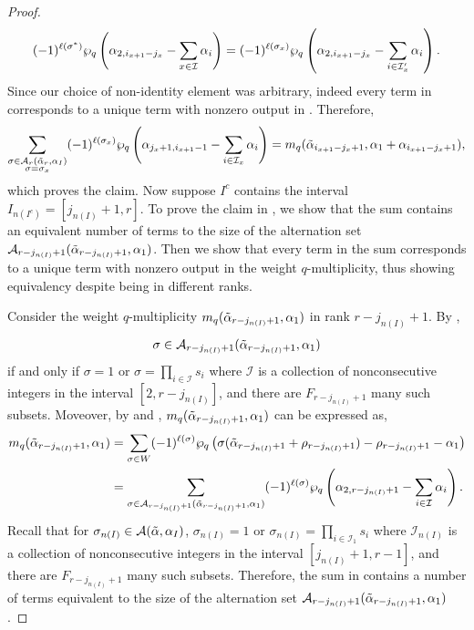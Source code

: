 \documentclass[10pt]{article}
\newcommand{\hr}[0]{\Tilde{\alpha}}
\newcommand{\newmu}[0]{\alpha_I}
\newcommand{\thealtset}[0]{\mathcal{A}(\hr,\newmu)}
\newcommand{\qpartition}[1]{\wp_q\left(#1\right)}
\begin{document}
\begin{proof}
    \begin{equation}
        (-1)^{\ell(\sigma^*)}\qpartition{\alpha_{2,i_{x+1}-j_x}-\sum_{x\in\mathcal{I}}\alpha_i} = (-1)^{\ell(\sigma_x)}\qpartition{\alpha_{2,i_{x+1}-j_x}-\sum_{i\in\mathcal{I}'_x}\alpha_i}.\notag
    \end{equation}
    Since our choice of non-identity element was arbitrary, indeed every term in  corresponds to a unique term with nonzero output in . Therefore, 
        \begin{equation}
        \sum_{\substack{\sigma\in\mathcal{A}_r(\hr_r,\alpha_I)\\\sigma=\sigma_x}}(-1)^{\ell(\sigma_x)}\qpartition{\alpha_{j_x+1,i_{x+1}-1}-\sum_{i\in\mathcal{I}_x}\alpha_i}=m_q(\hr_{i_{x+1}-j_x+1},\alpha_1+\alpha_{i_{x+1}-j_x+1}),\notag
    \end{equation}
    which proves the claim.
    Now suppose $I^c$ contains the interval $I_{n(I^c)}=[j_{n(I)}+1,r]$. To prove the claim in , we show that the sum contains an equivalent number of terms to the size of the alternation set $\mathcal{A}_{r-j_{n(I)}+1}(\hr_{r-j_{n(I)}+1},\alpha_1)$. Then we show that every term in the sum corresponds to a unique term with nonzero output in the weight $q$-multiplicity, thus showing equivalency despite being in different ranks.

    Consider the weight $q$-multiplicity $m_q(\hr_{r-j_{n(I)}+1},\alpha_1)$ in rank $r-j_{n(I)}+1$. By , 
    \[\sigma\in\mathcal{A}_{r-j_{n(I)}+1}(\hr_{r-j_{n(I)}+1},\alpha_1)\]
    if and only if $\sigma=1$ or $\sigma=\prod_{i\in\mathcal{I}}s_i$ where $\mathcal{I}$ is a collection of nonconsecutive integers in the interval $[2,r-j_{n(I)}]$, and there are $F_{r-j_{n(I)}+1}$ many such subsets. Moveover, by  and , $m_q(\hr_{r-j_{n(I)}+1},\alpha_1)$ can be expressed as,
    \begin{align}
        m_q(\hr_{r-j_{n(I)}+1},\alpha_1)&=\sum_{\sigma\in W}(-1)^{\ell(\sigma)}\qpartition{\sigma(\hr_{r-j_{n(I)}+1}+\rho_{r-j_{n(I)}+1})-\rho_{r-j_{n(I)}+1}-\alpha_1}\notag \\
        &= \sum_{\sigma\in\mathcal{A}_{r-j_{n(I)}+1}(\hr_{r-j_{n(I)}+1},\alpha_1)}(-1)^{\ell(\sigma)}\qpartition{\alpha_{2,r-j_{n(I)}+1}-\sum_{i\in\mathcal{I}}\alpha_i}.\label{right edge cleaned up}
    \end{align}
    Recall that for $\sigma_{n(I)}\in\thealtset$, $\sigma_{n(I)}=1$ or $\sigma_{n(I)}=\prod_{i\in\mathcal{I}_1}s_i$ where $\mathcal{I}_{n(I)}$ is a collection of nonconsecutive integers in the interval $[j_{n(I)}+1,r-1]$, and there are $F_{r-j_{n(I)}+1}$ many such subsets. Therefore, the sum in  contains a number of terms equivalent to  the size of the alternation set $\mathcal{A}_{r-j_{n(I)}+1}(\hr_{r-j_{n(I)}+1},\alpha_1)$.
    

\end{proof}
\end{document}

